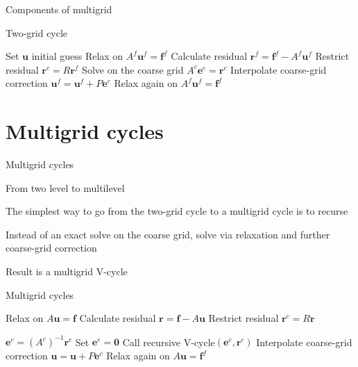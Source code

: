 \documentclass[18pt,xcolor=table]{beamer}
\begin{document}
\begin{frame}{Components of multigrid}
\begin{block}{Two-grid cycle}
\begin{algorithm}[H]
\caption{Two-grid cycle}
\begin{algorithmic}
\State Set $\mathbf{u}$ initial guess
\State Relax on $A^f\mathbf{u}^f = \mathbf{f}^f$
\State Calculate residual $\mathbf{r}^f = \mathbf{f}^f - A^f\mathbf{u}^f$
\State Restrict residual $\mathbf{r}^c = R\mathbf{r}^f$
\State Solve on the coarse grid $A^c\mathbf{e}^c = \mathbf{r}^c$
\State Interpolate coarse-grid correction $\mathbf{u}^f = \mathbf{u}^f + P\mathbf{e}^c$
\State Relax again on $A^f\mathbf{u}^f = \mathbf{f}^f$
\end{algorithmic}
\end{algorithm}
\end{block}
\end{frame}


\section{Multigrid cycles}

\begin{frame}{Multigrid cycles}
\begin{block}{From two level to multilevel}
\bit
\item The simplest way to go from the two-grid cycle to a multigrid cycle is to recurse
\item Instead of an exact solve on the coarse grid, solve via relaxation and further coarse-grid correction
\item Result is a multigrid V-cycle
\eit
\end{block}
\end{frame}

\begin{frame}{Multigrid cycles}

\begin{algorithm}[H]
\caption{Recursive V-cycle$(\mathbf{u},\mathbf{f})$}
\begin{algorithmic}
\State Relax on $A\mathbf{u} = \mathbf{f}$
\State Calculate residual $\mathbf{r} = \mathbf{f} - A\mathbf{u}$
\State Restrict residual $\mathbf{r}^c = R\mathbf{r}$

\State $\mathbf{e}^c = (A^c)^{-1}\mathbf{r}^c$
\Else
\State Set $\mathbf{e}^c = \mathbf{0}$
\State Call recursive V-cycle$(\mathbf{e}^c, \mathbf{r}^c)$
\EndIf
\State Interpolate coarse-grid correction $\mathbf{u} = \mathbf{u} + P\mathbf{e}^c$
\State Relax again on $A\mathbf{u} = \mathbf{f}^f$
\end{algorithmic}
\end{algorithm}
\end{frame}
\end{document}
